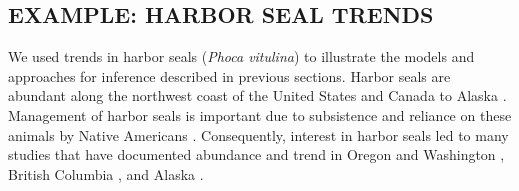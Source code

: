 \documentclass[11pt, titlepage]{article}\usepackage[]{graphicx}\usepackage[]{color}
\begin{document}
\begin{spacing}{1.9}
\begin{flushleft}
\section*{EXAMPLE: HARBOR SEAL TRENDS}






























We used trends in harbor seals (\emph{Phoca vitulina}) to illustrate the models and approaches for inference described in previous sections. Harbor seals are abundant along the northwest coast of the United States and Canada to Alaska \citep{Pitc:Calk:biol:1979}. Management of harbor seals is important due to subsistence and reliance on these animals by Native Americans \citep{Wolf:Fall:Stan:subs:2009}. Consequently, interest in harbor seals led to many studies that have documented abundance and trend in Oregon and Washington \citep{Harv:Brow:Mate:abun:1990,Hube:Jeff:Brow:Delo:Vanb:corr:2001,Jeff:Hube:Cala:Laak:tren:2003,Brow:Wrig:Riem:Laak:tren:2005}, British Columbia \citep{Bigg:harb:1969,Oles:Bigg:Elli:rece:1990,Oles:asse:1999}, and Alaska \citep{Pitc:majo:1990,Fros:Lowr:Ver:moni:1999,Smal:Pend:Pitc:tren:2003,Bove:Beng:With:Cesa:Simp:Fros:Burn:abun:2003,Ver:Fros:baye:2003,Math:Pend:decl:2006}.


\end{flushleft}
\end{spacing}
\end{document}
